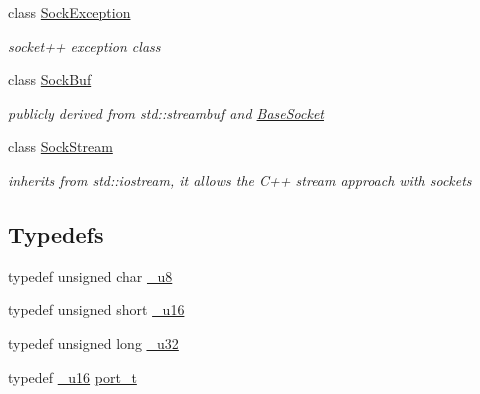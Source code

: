 \begin{CompactItemize}
class \hyperlink{classsocketpp_1_1SockException}{SockException}
\begin{CompactList}\small\item\em socket++ exception class \item\end{CompactList}\item 
class \hyperlink{classsocketpp_1_1SockBuf}{SockBuf}
\begin{CompactList}\small\item\em publicly derived from std::streambuf and \hyperlink{classsocketpp_1_1BaseSocket}{BaseSocket} \item\end{CompactList}\item 
class \hyperlink{classsocketpp_1_1SockStream}{SockStream}
\begin{CompactList}\small\item\em inherits from std::iostream, it allows the C++ stream approach with sockets \item\end{CompactList}\end{CompactItemize}
\subsection*{Typedefs}
\begin{CompactItemize}
\item 
typedef unsigned char \hyperlink{namespacesocketpp_1398da7d8125cdb32e89041e5b0adb96}{\_\-u8}
\item 
typedef unsigned short \hyperlink{namespacesocketpp_0d48e817f00cbb84d07faec41ee4b169}{\_\-u16}
\item 
typedef unsigned long \hyperlink{namespacesocketpp_d9c3b2ad093bb5814af59760e0a2192a}{\_\-u32}
\item 
typedef \hyperlink{namespacesocketpp_0d48e817f00cbb84d07faec41ee4b169}{\_\-u16} \hyperlink{namespacesocketpp_5517ef80f249b891a2ba64b95fc1e723}{port\_\-t}
\end{CompactItemize}
